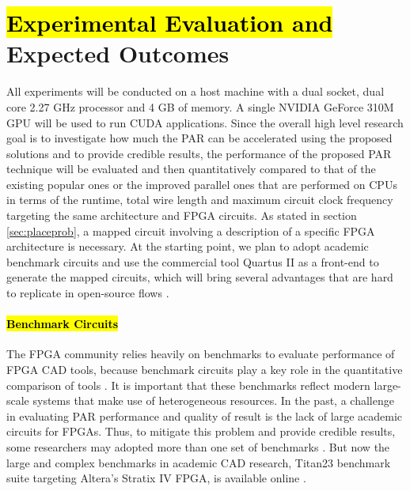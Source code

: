 \documentclass[a4paper,oneside,12pt]{article}
\begin{document}




\section{\hl{Experimental Evaluation and} Expected Outcomes}

All experiments will be conducted on a host machine with a dual socket, dual core 2.27 GHz processor and 4 GB of memory. A single NVIDIA GeForce 310M GPU will be used to run CUDA applications.
Since the overall high level research goal is to investigate how much the PAR can be accelerated using the proposed solutions and to provide credible results, the performance of the proposed PAR technique will be evaluated and then quantitatively compared to that of the existing popular ones or the improved parallel ones that are performed on CPUs in terms of the runtime, total wire length and maximum circuit clock frequency targeting the same architecture and FPGA circuits. As stated in section \ref{sec:placeprob}, a mapped circuit involving a description of a specific FPGA architecture is necessary. At the starting point, we plan to adopt academic benchmark circuits and use the commercial tool Quartus II as a front-end to generate the mapped circuits, which will bring several advantages that are hard to replicate in open-source flows \cite{murray2015timing}. 

\paragraph{\hl{Benchmark Circuits}}
The FPGA community relies heavily on benchmarks to evaluate performance of FPGA CAD tools, because benchmark circuits play a key role in the quantitative comparison of tools \cite{murray2015timing}. It is important that these benchmarks reflect modern large-scale systems that make use of heterogeneous resources.
In the past, a challenge in evaluating PAR performance and quality of result is the lack of large academic circuits for FPGAs. Thus, to mitigate this problem and provide credible results, some researchers may adopted more than one set of benchmarks \cite{bian2010towards}. But now the large and complex benchmarks in academic CAD research, Titan23 benchmark suite targeting Altera's Stratix IV FPGA, is available online \cite{Titan23}.
\end{document}
